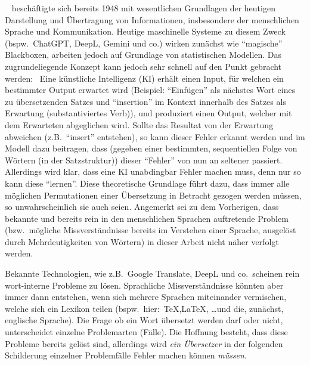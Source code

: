 ~\cite{bellSystemTechnicalJournal:claudeShannon1948:mathematicalTheoryOfCommunication} beschäftigte sich bereits 1948 mit wesentlichen Grundlagen der heutigen Darstellung und Übertragung von Informationen, insbesondere der menschlichen Sprache und Kommunikation. 
Heutige maschinelle Systeme zu diesem Zweck (bspw.\ ChatGPT, DeepL, Gemini und co.) wirken zunächst wie \enquote{magische} Blackboxen, arbeiten jedoch auf Grundlage von statistischen Modellen. Das zugrundeliegende Konzept kann jedoch sehr schnell auf den Punkt gebracht werden:\ 
Eine künstliche Intelligenz (KI) erhält einen Input, für welchen ein bestimmter Output erwartet wird (Beispiel: \enquote{Einfügen} als nächstes Wort eines zu übersetzenden Satzes und \enquote{insertion} im Kontext innerhalb des Satzes als Erwartung (substantiviertes Verb)), und produziert einen Output, welcher mit dem Erwarteten abgeglichen wird. Sollte das Resultat von der Erwartung abweichen (z.B.\ \enquote{insert} entstehen), so kann dieser Fehler erkannt werden und im Modell dazu beitragen, dass (gegeben einer bestimmten, sequentiellen Folge von Wörtern (in der Satzstruktur)) dieser \enquote{Fehler} von nun an seltener passiert. Allerdings wird klar, dass eine KI unabdingbar Fehler machen muss, denn nur so kann diese \enquote{lernen}. Diese theoretische Grundlage führt dazu, dass immer alle möglichen Permutationen einer Übersetzung in Betracht gezogen werden müssen, so unwahrscheinlich sie auch seien. Angemerkt sei zu dem Vorherigen, dass bekannte und bereits rein in den menschlichen Sprachen auftretende Problem (bzw.\ mögliche Missverständnisse bereits im Verstehen einer Sprache, ausgelöst durch Mehrdeutigkeiten von Wörtern) in dieser Arbeit nicht näher verfolgt werden.

Bekannte Technologien, wie z.B.\ Google Translate, DeepL und co.\ scheinen rein wort-interne Probleme zu lösen. Sprachliche Missverständnisse könnten aber immer dann entstehen, wenn sich mehrere Sprachen miteinander vermischen, welche sich ein Lexikon teilen (bspw.\ hier:\ \TeX{},\LaTeX{}, \ldots und die, zunächst, englische Sprache). Die Frage ob ein Wort übersetzt werden darf oder nicht, unterscheidet einzelne Problemarten (Fälle). Die Hoffnung besteht, dass diese Probleme bereits gelöst sind, allerdings wird \textit{ein Übersetzer} in der folgenden Schilderung einzelner Problemfälle Fehler machen können \textit{müssen}.

\newpage